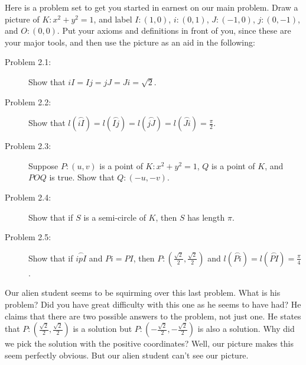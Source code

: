 \documentclass[english]{book}
\newcommand{\arc}[1]{\overset{\frown}{#1} }
\begin{document}
Here is a problem set to get you started in earnest on our main problem. Draw a picture of $K:x^{2} + y^{2} = 1$, and label $I:(1,0)$, $i:(0,1)$, $J:(-1,0)$, $j:(0,-1)$, and $O:(0,0)$. Put your axioms and definitions in front of you, since these are your major tools, and then use the picture as an aid in the following:

\begin{description}

\item[Problem 2.1:] Show that $iI = Ij = jJ = Ji = \sqrt{2}$.

\item[Problem 2.2:] Show that $l(\arc{iI}) = l(\arc{Ij}) = l(\arc{jJ}) = l(\arc{Ji}) = \frac{\pi}{2}$.

\item[Problem 2.3:] Suppose $P:(u,v)$ is a point of $K:x^{2} + y^{2} = 1$, $Q$ is a point of $K$, and $POQ$ is true. Show that $Q:(-u,-v)$.

\item[Problem 2.4:] Show that if $S$ is a semi-circle of $K$, then $S$ has length $\pi$.

\item[Problem 2.5:] Show that if $\arc{ipI}$ and $Pi = PI$, then $P:(\frac{\sqrt{2}}{2}, \frac{\sqrt{2}}{2})$ and $l(\arc{Pi}) = l(\arc{PI}) = \frac{\pi}{4}$.

\end{description}

Our alien student seems to be squirming over this last problem. What is his problem? Did you have great difficulty with this one as he seems to have had? He claims that there are two possible answers to the problem, not just one. He states that $P:(\frac{\sqrt{2}}{2}, \frac{\sqrt{2}}{2})$ is a solution but $P:(-\frac{\sqrt{2}}{2}, -\frac{\sqrt{2}}{2})$ is also a solution. Why did we pick the solution with the positive coordinates? Well, our picture makes this seem perfectly obvious. But our alien student can't see our picture.
\end{document}
